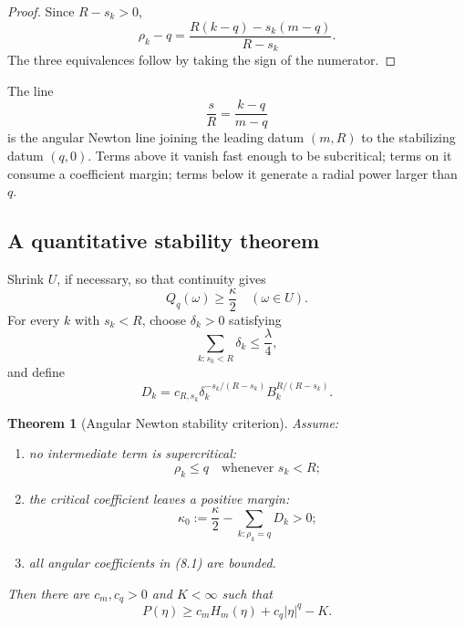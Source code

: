 \documentclass[11pt]{article}
\newtheorem{theorem}{Theorem}[section]
\theoremstyle{remark}
\begin{document}
\begin{proof}
Since \(R-s_k>0\),
\[
 \rho_k-q
 =
 \frac{R(k-q)-s_k(m-q)}{R-s_k}.                    \tag{8.10}
\]
The three equivalences follow by taking the sign of the numerator.
\end{proof}

The line
\[
 \frac{s}{R}=\frac{k-q}{m-q}                       \tag{8.11}
\]
is the angular Newton line joining the leading datum
\((m,R)\) to the stabilizing datum \((q,0)\).  Terms above it vanish
fast enough to be subcritical; terms on it consume a coefficient
margin; terms below it generate a radial power larger than \(q\).

\subsection{A quantitative stability theorem}

Shrink \(U\), if necessary, so that continuity gives
\[
 Q_q(\omega)\geq\frac{\kappa}{2}
 \quad(\omega\in U).                                \tag{8.12}
\]
For every \(k\) with \(s_k<R\), choose
\(\delta_k>0\) satisfying
\[
 \sum_{k:s_k<R}\delta_k\leq\frac{\lambda}{4},       \tag{8.13}
\]
and define
\[
 D_k=
 c_{R,s_k}\delta_k^{-s_k/(R-s_k)}
 B_k^{R/(R-s_k)}.                                  \tag{8.14}
\]

\begin{theorem}[Angular Newton stability criterion]
\label{thm:v17v8-stability}
Assume:
\begin{enumerate}
\item no intermediate term is supercritical:
      \[
      \rho_k\leq q\quad\text{whenever }s_k<R;       \tag{8.15}
      \]
\item the critical coefficient leaves a positive margin:
      \[
      \kappa_0:=
      \frac{\kappa}{2}
      -\sum_{k:\rho_k=q}D_k>0;                      \tag{8.16}
      \]
\item all angular coefficients in (8.1) are bounded.
\end{enumerate}
Then there are \(c_m,c_q>0\) and \(K<\infty\) such that
\[
 P(\eta)\geq
 c_mH_m(\eta)+c_q|\eta|^q-K.                       \tag{8.17}
\]
\end{theorem}
\end{document}
